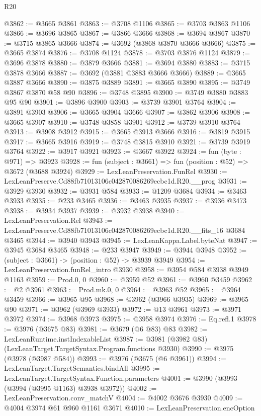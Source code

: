 \begin{lexlean}{R20}
\begin{coremodule}
@3862 := @3665 @3861
@3863 := @3708 @1106
@3865 := @3703 @3863 @1106
@3866 := @3696 @3865
@3867 := @3866 @3666
@3868 := @3694 @3867
@3870 := @3715 @3865 @3666
@3874 := @3692 (@3868 @3870 @3666 @3666)
@3875 := @3665 @3874
@3876 := @3708 @1124
@3878 := @3703 @3876 @1124
@3879 := @3696 @3878
@3880 := @3879 @3666
@3881 := @3694 @3880
@3883 := @3715 @3878 @3666
@3887 := @3692 (@3881 @3883 @3666 @3666)
@3889 := @3665 @3887 @3666
@3890 := @3875 @3889
@3891 := @3665 @3890
@3895 := @3749 @3867 @3870 @58 @90
@3896 := @3748 @3895
@3900 := @3749 @3880 @3883 @95 @90
@3901 := @3896 @3900
@3903 := @3739 @3901 @3764
@3904 := @3891 @3903
@3906 := @3665 @3904 @3666
@3907 := @3862 @3906
@3908 := @3665 @3907
@3910 := @3748 @3858 @3901
@3912 := @3739 @3910 @3764
@3913 := @3908 @3912
@3915 := @3665 @3913 @3666
@3916 := @3819 @3915
@3917 := @3665 @3916
@3919 := @3748 @3815 @3910
@3921 := @3739 @3919 @3764
@3922 := @3917 @3921
@3923 := @3667 @3922
@3924 := fun (byte : @971) => @3923
@3928 := fun (subject : @3661) => fun (position : @52) => @3672 (@3688 @3924)
@3929 := LexLeanPreservation.FunRel
@3930 := LexLeanPreserve.Cd88fb71013106c042870086269ecbc1d.R20.__prog
@3931 := @3929 @3930
@3932 := @3931 @584
@3933 := @1209 @3684
@3934 := @3463 @3933
@3935 := @233 @3465
@3936 := @3463 @3935
@3937 := @3936 @3473
@3938 := @3934 @3937
@3939 := @3932 @3938
@3940 := LexLeanPreservation.Rel
@3943 := LexLeanPreserve.Cd88fb71013106c042870086269ecbc1d.R20.__fits_16 @3684 @3465
@3944 := @3940 @3943
@3945 := LexLeanKappa.Label.byteNat
@3947 := @3945 @3684 @3465
@3948 := @233 @3947
@3949 := @3944 @3948
@3952 := (subject : @3661) -> (position : @52) -> @3939 @3949
@3954 := LexLeanPreservation.funRel_intro @3930
@3958 := @3954 @584 @3938 @3949 @1163
@3959 := Prod.{0, 0}
@3960 := @3959 @52
@3961 := @3960 @3459
@3962 := @2 @3961
@3963 := Prod.mk.{0, 0}
@3964 := @3963 @52
@3965 := @3964 @3459
@3966 := @3965 @95
@3968 := @3962 (@3966 @3935)
@3969 := @3965 @90
@3971 := @3962 (@3969 @3933)
@3972 := @13 @3961
@3973 := @3971 @3972
@3974 := @3968 @3973
@3975 := @3958 @3974
@3976 := Eq.refl.{1}
@3978 := @3976 (@3675 @83)
@3981 := @3679 (@6 @83) @83
@3982 := LexLeanRuntime.instIndexableList
@3987 := @3981 (@3982 @83) (LexLeanTarget.TargetSyntax.Program.functions @3930)
@3990 := @3975 (@3978 (@3987 @584))
@3993 := @3976 (@3675 (@6 @3961))
@3994 := LexLeanTarget.TargetSemantics.bindAll
@3995 := LexLeanTarget.TargetSyntax.Function.parameters
@4001 := @3990 (@3993 (@3994 (@3995 @1163) @3938 @3972))
@4002 := LexLeanPreservation.conv_matchV
@4004 := @4002 @3676 @3930
@4009 := @4004 @3974 @61 @960 @1161 @3671
@4010 := LexLeanPreservation.encOption

\end{coremodule}
\end{lexlean}
